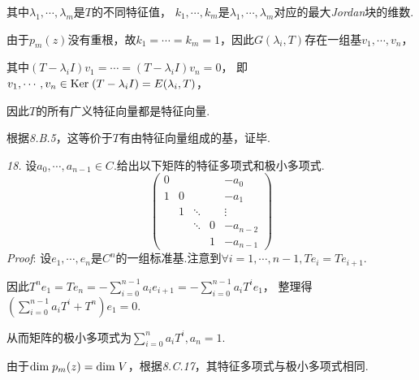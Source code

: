 其中\(\lambda_1,\cdots,\lambda_m\)是\(T\)的不同特征值，
\(k_1,\cdots,k_m\)是\(\lambda_1,\cdots,\lambda_m\)对应的最大\textit{Jordan}块的维数.

由于\(p_m(z)\)没有重根，故\(k_1=\cdots=k_m=1\)，因此\(G(\lambda_i,T)\)存在一组基\(v_1,\cdots,v_n\)，

其中\((T-\lambda_i I)v_1=\cdots=(T-\lambda_i I)v_n=0\)，
即\(v_1,\cdots,v_n \in \mathrm{Ker \;} (T-\lambda_i I)=E(\lambda_i,T)\)，

因此\(T\)的所有广义特征向量都是特征向量.

根据\textit{8.B.5}，这等价于\(T\)有由特征向量组成的基，证毕.

\hspace*{\fill}

\textit{18.}
设\(a_0,\cdots,a_{n-1} \in C\).给出以下矩阵的特征多项式和极小多项式.
    \begin{equation*}
        \begin{pmatrix}
            0 &   &        &   & -a_0     \\
            1 & 0 &        &   & -a_1     \\
              & 1 & \ddots &   & \vdots   \\
              &   & \ddots & 0 & -a_{n-2} \\
              &   &        & 1 & -a_{n-1} 
        \end{pmatrix}
    \end{equation*}
\textit{Proof}:
设\(e_1,\cdots,e_n\)是\(C^n\)的一组标准基.注意到\(\forall i=1,\cdots,n-1,Te_i=Te_{i+1}\).

因此\(T^n e_1=Te_n=-\sum_{i=0}^{n-1}a_ie_{i+1}=-\sum_{i=0}^{n-1}a_iT^ie_1\)，
整理得\((\sum_{i=0}^{n-1}a_iT^i+T^n)e_1=0\).

从而矩阵的极小多项式为\(\sum_{i=0}^n a_iT^i,a_n=1\).

由于\(\mathrm{dim \;} p_m(z)=\mathrm{dim \;} V\)，根据\textit{8.C.17}，其特征多项式与极小多项式相同.

